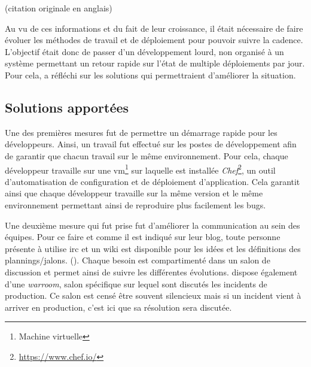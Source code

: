 \epigraph{}{ \cite{etsyInterview} (citation originale en anglais)}

Au vu de ces informations et du fait de leur croissance, il était nécessaire de faire évoluer les méthodes de travail et de déploiement pour pouvoir suivre la cadence. L'objectif était donc de passer d'un développement lourd, non organisé à un système permettant un retour rapide sur l'état de multiple déploiements par jour. Pour cela, \etsy{} a réfléchi sur les solutions qui permettraient d'améliorer la situation. 

\subsection{Solutions apportées}

Une des premières mesures fut de permettre un démarrage rapide pour les développeurs. Ainsi, un travail fut effectué sur les postes de développement afin de garantir que chacun travail sur le même environnement. Pour cela, chaque développeur travaille sur une \gls{vm}\footnote{Machine virtuelle} sur laquelle est installée \emph{Chef}\footnote{\url{https://www.chef.io/}}, un outil d'automatisation de configuration et de déploiement d'application. Cela garantit ainsi que chaque développeur travaille sur la même version et le même environnement permettant ainsi de reproduire plus facilement les bugs. 

Une deuxième mesure qui fut prise fut d'améliorer la communication au sein des équipes. Pour ce faire et comme il est indiqué sur leur blog, toute personne présente à \etsy{} utilise \gls{irc} et un wiki est disponible pour les idées et les définitions des plannings/jalons. (). Chaque besoin est compartimenté dans un salon de discussion et permet ainsi de suivre les différentes évolutions. \etsy{} dispose également d'une \emph{warroom}, salon spécifique sur lequel sont discutés les incidents de production. Ce salon est censé être souvent silencieux mais si un incident vient à arriver en production, c'est ici que sa résolution sera discutée.

